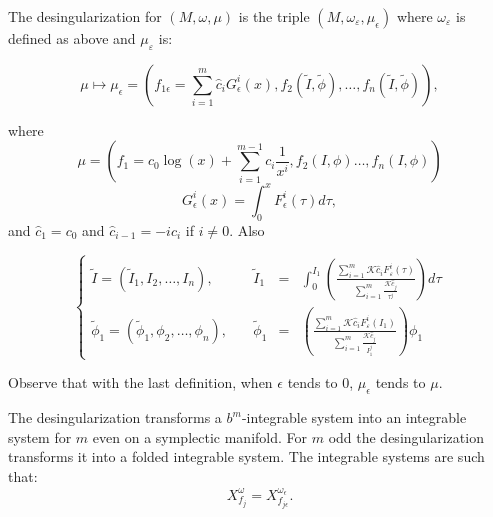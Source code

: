 \begin{definition}
The desingularization for $(M,\omega,\mu)$ is the triple $(M,\omega_\varepsilon,\mu_\epsilon)$ where $\omega_\varepsilon$ is defined as above and $\mu_\varepsilon$ is:

$$
\mu    \mapsto \mu_\epsilon = \left(f_{1\epsilon} = \sum_{i = 1}^{m} \hat{c}_i G_{\epsilon}^i(x), f_2(\tilde I,\tilde \phi), \ldots, f_n(\tilde I,\tilde \phi)\right),
$$

where 
$$\mu = \left(f_1 = c_0 \log(x) + \sum_{i = 1}^{m-1} c_i \frac{1}{x^i},f_2(I,\phi) \ldots, f_n(I,\phi)\right)$$ 
$$G_\epsilon^i(x) = \int_0^x F_\epsilon^i(\tau)d\tau,$$
and $\hat{c}_1 = c_0$ and $\hat{c}_{i-1} = -ic_i$ if $i \neq 0$. Also

$$
\left\{
\begin{array}{lrcl}
\tilde I = (\tilde I_1, I_2,\ldots, I_n), &\quad \tilde I_1 & = & \int_0^{I_1}\left(\frac{\sum_{i=1}^m \mathcal{K} \hat c_i F_\varepsilon^i(\tau)}{\sum_{i=1}^m \frac{\mathcal{K} \hat c_j}{\tau^j}}\right) d\tau \\

\tilde \phi_1 = (\tilde \phi_1, \phi_2,\ldots, \phi_n), & \quad \tilde \phi_1 & = & \left(\frac{\sum_{i=1}^m \mathcal{K} \hat c_i F_\varepsilon^i(I_1)}{\sum_{i=1}^m \frac{\mathcal{K} \hat c_j}{I_1^j}}\right) \phi_1
\end{array}
\right.
$$

\end{definition}

\begin{remark}
Observe that with the last definition, when $\epsilon$ tends to $0$, $\mu_\epsilon$ tends to $\mu$.
\end{remark}

\begin{theoremC}
The desingularization transforms a $b^m$-integrable system into an integrable system for $m$ even on a symplectic manifold. For $m$ odd the desingularization transforms it into a folded integrable system. The integrable systems are such that:
$$X_{f_j}^\omega = X_{f_{j\epsilon}}^{\omega_\epsilon}.$$
\end{theoremC}

